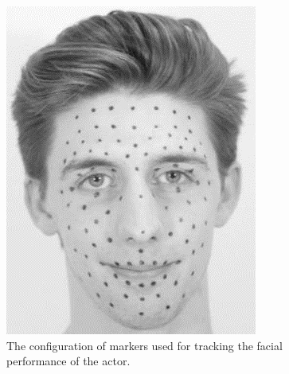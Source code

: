 \documentclass[11pt]{report}
\begin{document}
\begin{figure}[htbp!]
\begin{minipage}[b]{0.47\textwidth}
\centering
\includegraphics[width=\textwidth]{img/facemarkers}
	\caption{ The configuration of markers used for tracking the facial performance of the actor.}
	\label{fig:facemarkers}
\end{minipage}
\hfill
\begin{minipage}[b]{0.5\textwidth}
\centering

\end{minipage}
\end{figure}
\end{document}
